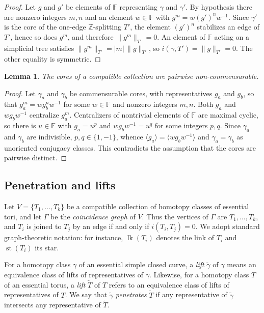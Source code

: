 \documentclass[12pt,a4paper]{amsart}
\numberwithin{equation}{section}
\newcommand{\FF}{\mathbb{F}}
\newcommand{\ZZ}{\mathbb{Z}}
\theoremstyle{plain}
\newtheorem{lemma}[theorem]{Lemma}
\theoremstyle{definition}
\theoremstyle{remark}
\begin{document}
\begin{proof}
    Let $g$ and $g'$ be elements of $\FF$ representing $\gamma$ and $\gamma'$.
    By hypothesis there are nonzero integers $m, n$ and an element $w \in \FF$ with $g^m = w (g')^n w^{-1}$.
    Since $\gamma'$ is the core of the one-edge $\ZZ$-splitting $T'$, the element $(g')^n$ stabilizes an edge of $T'$, hence so does $g^m$, and therefore $\lVert g^m \rVert_{T'} = 0$.
    An element of $\FF$ acting on a simplicial tree satisfies $\lVert g^m \rVert_{T'} = \lvert m \rvert \, \lVert g \rVert_{T'}$, so $i(\gamma, T') = \lVert g \rVert_{T'} = 0$.
    The other equality is symmetric.
\end{proof}

\begin{lemma} \label{lem:compatible_noncomm}
    The cores of a compatible collection are pairwise non-commensurable.
\end{lemma}

\begin{proof}
    Let $\gamma_a$ and $\gamma_b$ be commensurable cores, with representatives $g_a$ and $g_b$, so that $g_a^{m} = w g_b^{n} w^{-1}$ for some $w \in \FF$ and nonzero integers $m, n$.
    Both $g_a$ and $w g_b w^{-1}$ centralize $g_a^{m}$.
    Centralizers of nontrivial elements of $\FF$ are maximal cyclic, so there is $u \in \FF$ with $g_a = u^{p}$ and $w g_b w^{-1} = u^{q}$ for some integers $p, q$.
    Since $\gamma_a$ and $\gamma_b$ are indivisible, $p, q \in \{1, -1\}$, whence $\langle g_a \rangle = \langle w g_b w^{-1} \rangle$ and $\gamma_a = \gamma_b$ as unoriented conjugacy classes.
    This contradicts the assumption that the cores are pairwise distinct.
\end{proof}

\subsection{Penetration and lifts}

Let \(V = \{T_{1}, \dots, T_{k}\}\) be a compatible collection of homotopy classes of essential tori, and let \(\Gamma\) be the \emph{coincidence graph} of \(V\).  
Thus the vertices of \(\Gamma\) are \(T_{1}, \dots, T_{k}\), and \(T_{i}\) is joined to \(T_{j}\) by an edge if and only if \(i(T_{i}, T_{j}) = 0\).  
We adopt standard graph-theoretic notation: for instance, \(\operatorname{lk}(T_{i})\) denotes the link of \(T_{i}\) and \(\operatorname{st}(T_{i})\) its star.

For a homotopy class \(\gamma\) of an essential simple closed curve, a \emph{lift} $\tilde\gamma$ of \(\gamma\) means an equivalence class of lifts of representatives of \(\gamma\).  
Likewise, for a homotopy class \(T\) of an essential torus, a \emph{lift} $\tilde{T}$ of \(T\) refers to an equivalence class of lifts of representatives of \(T\).
We say that \(\tilde{\gamma}\) \emph{penetrates} \(\tilde{T}\) if any representative of \(\tilde{\gamma}\) intersects any representative of \(\tilde{T}\).
\end{document}
